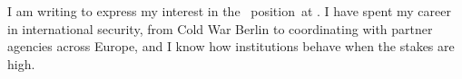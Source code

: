 
I am writing to express my interest in the \theposition\ position\maybeteam\ at \theemployer\maybejobref. I have spent my career in international security, from Cold War Berlin to coordinating with partner agencies across Europe, and I know how institutions behave when the stakes are high.\maybeappsentence
